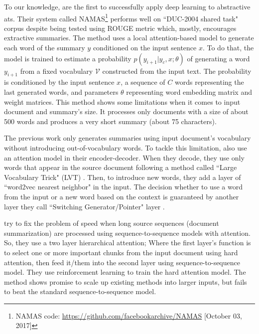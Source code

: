 To our knowledge, \citet{15-rush-al} are the first to successfully apply deep learning to abstractive \ac{ats}. 
Their system called NAMAS\footnote{NAMAS code: \url{https://github.com/facebookarchive/NAMAS} [October 03, 2017]} performs well on ``DUC-2004 shared task" corpus despite being tested using ROUGE metric which, mostly, encourages extractive summaries. 
The method uses a local attention-based model to generate each word of the summary $ y $ conditioned on the input sentence $ x $.
To do that, the model is trained to estimate a probability $ p(y_{i+1}|y_c, x; \theta) $ of generating a word $ y_{i+1} $ from a fixed vocabulary $ \mathcal{V} $ constructed from the input text. 
The probability is conditioned by the input sentence $ x $, a sequence of $ C $ words representing the last generated words, and parameters $ \theta $ representing word embedding matrix and weight matrices.
This method shows some limitations when it comes to input document and summary's size. 
It processes only documents with a size of about 500 words and produces a very short summary (about 75 characters). 

The previous work only generates summaries using input document's vocabulary without introducing out-of-vocabulary words.
To tackle this limitation, \citet{16-nallapati-al} also use an attention model in their encoder-decoder.
When they decode, they use only words that appear in the source document following a method called ``Large Vocabulary Trick" (LVT) \citep{15-jean-al}. 
Then, to introduce new words, they add a layer of ``word2vec nearest neighbor" in the input. 
The decision whether to use a word from the input or a new word based on the context is guaranteed by another layer they call ``Switching Generator/Pointer" layer \citep{15-luong-al,15-vinyals-al}.


\citet{17-ling-rush} try to fix the problem of speed when long source sequences (document summarization) are processed using sequence-to-sequence models with attention.
So, they use a two layer hierarchical attention; Where the first layer's function is to select one or more important chunks from the input document using hard attention, then feed it/them into the second layer using sequence-to-sequence model.
They use reinforcement learning to train the hard attention model.
The method shows promise to scale up existing methods into larger inputs, but fails to beat the standard sequence-to-sequence model. 




